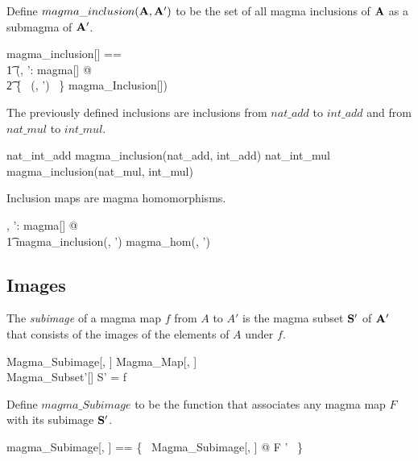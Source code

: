 \documentclass{amsart}
\begin{document}
Define $magma\_inclusion(\mathbf{A}, \mathbf{A}')$ to be the set of all magma inclusions of 
$\mathbf{A}$ as a submagma of $\mathbf{A}'$.

\begin{zed}
	magma\_inclusion[\genT] == \\
	\t1	(\lambda \strucA, \strucA': magma[\genT] @ \\
	\t2		\{~ (\strucA, \strucA') ~\} \dres magma\_Inclusion[\genT])
\end{zed}

\begin{example}
The previously defined inclusions are inclusions from $nat\_add$ to $int\_add$
and from $nat\_mul$ to $int\_mul$.

\begin{zed}
	nat\_int\_add \in magma\_inclusion(nat\_add, int\_add)
\also
	nat\_int\_mul \in magma\_inclusion(nat\_mul, int\_mul)
\end{zed}

\end{example}

\begin{remark}
Inclusion maps are magma homomorphisms.

\begin{zed}
	\forall \strucA, \strucA': magma[\setT] @ \\
	\t1	magma\_inclusion(\strucA, \strucA') \subseteq magma\_hom(\strucA, \strucA')
\end{zed}

\end{remark}

\subsection{Images}

The \textit{subimage} of a magma map $f$ from $A$ to $A'$
is the magma subset $\mathbf{S}'$ of $\mathbf{A}'$ that consists of
the images of the elements of $A$ under $f$.

\begin{schema}{Magma\_Subimage}[\genT, \genU]
	Magma\_Map[\genT, \genU] \\
	Magma\_Subset'[\genU]
\where
	S' = \ran f
\end{schema}

Define $magma\_Subimage$ to be the function that associates any magma map $F$ with its subimage $\mathbf{S}'$.

\begin{zed}
	magma\_Subimage[\genT, \genU] == \{~ Magma\_Subimage[\genT, \genU] @ F \mapsto \strucS' ~\}
\end{zed}
\end{document}
